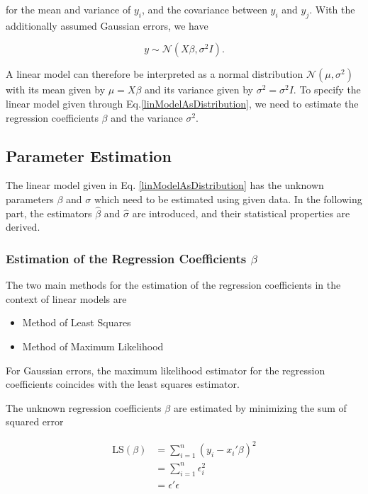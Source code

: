 for the mean and variance of $y_i$, and the covariance between $y_i$ and $y_j$. With the additionally assumed Gaussian errors, we have

\begin{equation} \label{linModelAsDistribution}
y \sim \mathcal N(X\beta, \sigma^2 I).
\end{equation}

A linear model can therefore be interpreted as a normal distribution $\mathcal N(\mu, \sigma^2)$ with its mean given by $\mu = X\beta$ and its variance given by $\sigma^2 = \sigma^2 I$. To specify the linear model given through Eq.\ref{linModelAsDistribution}, we need to estimate the regression coefficients $\beta$ and the variance $\sigma^2$.


\subsection{Parameter Estimation}

The linear model given in Eq. \ref{linModelAsDistribution} has the unknown parameters $\beta$ and $\sigma$ which need to be estimated using given data. In the following part, the estimators $\hat \beta$ and $\hat \sigma$ are introduced, and their statistical properties are derived. 

\subsubsection{Estimation of the Regression Coefficients $\beta$}

The two main methods for the estimation of the regression coefficients in the context of linear models are

\begin{itemize}
	\item Method of Least Squares
	\item Method of Maximum Likelihood
\end{itemize}	

For Gaussian errors, the maximum likelihood estimator for the regression coefficients coincides with the least squares estimator. 


The unknown regression coefficients $\beta$ are estimated by minimizing the sum of squared error

\begin{equation} \label{MethodOfLS} 
\begin{split} 
\text{LS}(\beta) &=  \sum_{i=1}^n(y_i - x_i'\beta)^2 \\ 
	&= \sum_{i=1}^n\epsilon_i^2  \\
	&= \epsilon'\epsilon
\end{split}
\end{equation}

